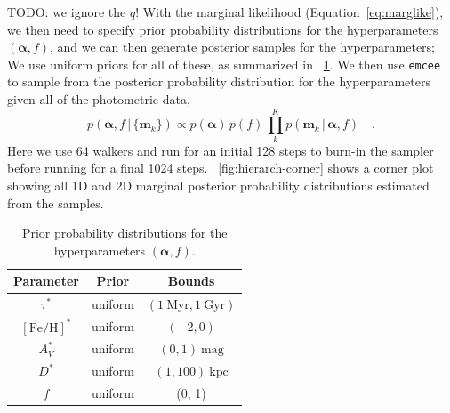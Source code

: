 \documentclass[modern]{aastex62}
\newcommand{\todo}[1]{{\color{red} TODO: #1}}
\newcommand{\bs}[1]{\boldsymbol{#1}}
\newcommand{\equationname}{Equation}
\newcommand{\given}{\,|\,}
\newcommand{\kpc}{\textrm{kpc}}
\newcommand{\feh}{\ensuremath{[\textrm{Fe} / \textrm{H}]}}
\begin{document}
\todo{we ignore the $q$!}
With the marginal likelihood (\equationname~\ref{eq:marglike}), we then need to specify prior probability distributions for the hyperparameters $(\bs{\alpha}, f)$, and we can then generate posterior samples for the hyperparameters;
We use uniform priors for all of these, as summarized in \tablename~\ref{tbl:hyperpriors}.
We then use \texttt{emcee} \citep{Goodman:XX, Foreman-Mackey:2013} to sample from the posterior probability distribution for the hyperparameters given all of the photometric data,
\begin{equation}
    p(\bs{\alpha}, f \given \{\bs{m}_k\}) \propto
        p(\bs{\alpha}) \, p(f) \,
        \prod_k^K p(\bs{m}_k \given \bs{\alpha}, f) \quad .
\end{equation}
Here we use 64 walkers and run for an initial 128 steps to burn-in the sampler before running for a final 1024 steps.
\figurename~\ref{fig:hierarch-corner} shows a corner plot showing all 1D and 2D marginal posterior probability distributions estimated from the samples.

\begin{table}[ht]
\begin{center}
    \begin{tabular}{ c | c | c }
        \toprule
        Parameter & Prior & Bounds \\
        \toprule
        $\tau^*$ & uniform & $(1~\textrm{Myr}, 1~\textrm{Gyr})$ \\
        $\feh^*$ & uniform & $(-2, 0)$ \\
        $A_V^*$ & uniform & $(0, 1)~\textrm{mag}$ \\
        $D^*$ & uniform & $(1, 100)~\kpc$ \\
        $f$ & uniform & (0, 1) \\
        \toprule
    \end{tabular}
\caption{Prior probability distributions for the hyperparameters $(\bs{\alpha}, f)$.
\label{tbl:hyperpriors}}
\end{center}
\end{table}

\end{document}
